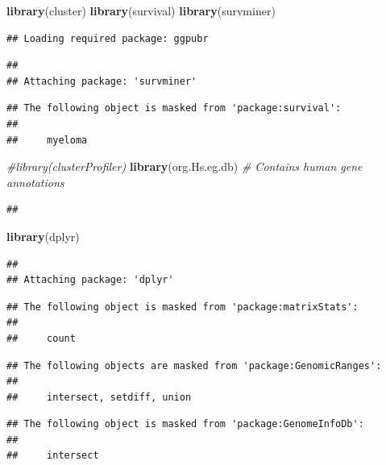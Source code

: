 \documentclass[
]{article}
\newenvironment{Shaded}{\begin{snugshade}}{\end{snugshade}}
\newcommand{\CommentTok}[1]{\textcolor[rgb]{0.56,0.35,0.01}{\textit{#1}}}
\newcommand{\FunctionTok}[1]{\textcolor[rgb]{0.13,0.29,0.53}{\textbf{#1}}}
\newcommand{\NormalTok}[1]{#1}
\begin{document}
\begin{Shaded}
\begin{Highlighting}[]
\FunctionTok{library}\NormalTok{(cluster)}
\FunctionTok{library}\NormalTok{(survival)}
\FunctionTok{library}\NormalTok{(survminer)}
\end{Highlighting}
\end{Shaded}

\begin{verbatim}
## Loading required package: ggpubr
\end{verbatim}

\begin{verbatim}
## 
## Attaching package: 'survminer'
\end{verbatim}

\begin{verbatim}
## The following object is masked from 'package:survival':
## 
##     myeloma
\end{verbatim}

\begin{Shaded}
\begin{Highlighting}[]
\CommentTok{\#library(clusterProfiler)}
\FunctionTok{library}\NormalTok{(org.Hs.eg.db) }\CommentTok{\# Contains human gene annotations}
\end{Highlighting}
\end{Shaded}

\begin{verbatim}
## 
\end{verbatim}

\begin{Shaded}
\begin{Highlighting}[]
\FunctionTok{library}\NormalTok{(dplyr)}
\end{Highlighting}
\end{Shaded}

\begin{verbatim}
## 
## Attaching package: 'dplyr'
\end{verbatim}

\begin{verbatim}
## The following object is masked from 'package:matrixStats':
## 
##     count
\end{verbatim}

\begin{verbatim}
## The following objects are masked from 'package:GenomicRanges':
## 
##     intersect, setdiff, union
\end{verbatim}

\begin{verbatim}
## The following object is masked from 'package:GenomeInfoDb':
## 
##     intersect
\end{verbatim}
\end{document}
